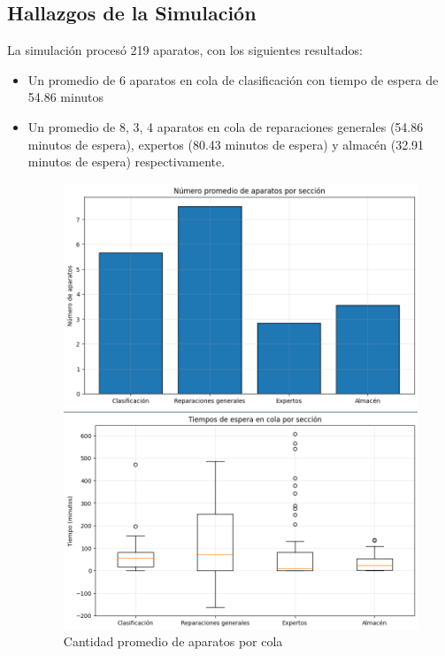 \documentclass[12pt]{article}
\begin{document}
\subsection{Hallazgos de la Simulación}
La simulación procesó 219 aparatos, con los siguientes resultados:
\begin{itemize}
    \item Un promedio de 6 aparatos en cola de clasificación con tiempo de espera de 54.86 minutos
    \item Un promedio de 8, 3, 4 aparatos en cola de reparaciones generales (54.86 minutos de espera), expertos (80.43 minutos de espera) y almacén (32.91 minutos de espera) respectivamente.
    \begin{figure}[H]
        \centering
        \begin{minipage}{0.45\textwidth}
            \centering
            \includegraphics[width=\textwidth]{appliences_queue.png}
            \caption{Cantidad promedio de aparatos por cola}
            \label{fig: Cantidad promedio de aparatos por cola}
        \end{minipage}
        \hfill
        \begin{minipage}{0.45\textwidth}
            \centering
            \includegraphics[width=\textwidth]{queue_times.png}

\end{minipage}
\end{figure}
\end{itemize}
\end{document}
